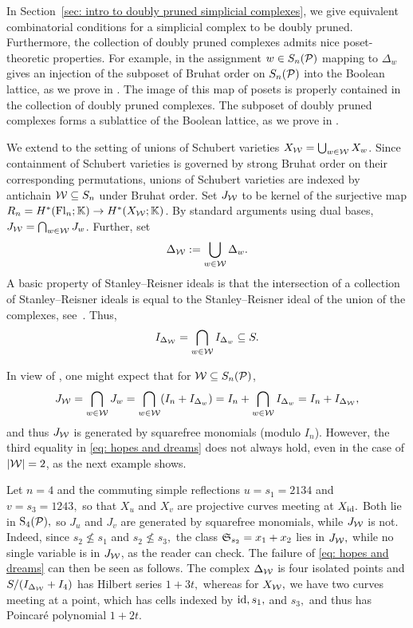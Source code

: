 In Section~\ref{sec: intro to doubly pruned simplicial complexes}, we give equivalent combinatorial conditions for a simplicial complex to be doubly pruned. Furthermore, the collection of doubly pruned complexes admits nice poset-theoretic properties. For example, in the assignment $w\in S_n(\mathcal{P})$ mapping to $\Delta_w$ gives an injection of the subposet of Bruhat order on $S_n(\mathcal{P})$ into the Boolean lattice, as we prove in . The image of this map of posets is properly contained in the collection of doubly pruned complexes. The subposet of doubly pruned complexes forms a sublattice of the Boolean lattice, as we prove in .





We extend  to the setting of unions of Schubert varieties $X_{\mathcal{W}} = \bigcup_{w\in \mathcal{W}}X_w$. Since containment of Schubert varieties is governed by strong Bruhat order on their corresponding permutations, unions of Schubert varieties are indexed by antichain $\mathcal{W}\subseteq S_n$ under Bruhat order. Set $J_{\mathcal{W}}$ to be kernel of the surjective map $R_n = H^*(\mathrm{Fl}_n;\mathbb{K})\to H^*(X_{\mathcal{W}};\mathbb{K})$. By standard arguments using dual bases, $J_{\mathcal{W}} = \bigcap_{w\in \mathcal{W}}J_w$. Further, set
\[
\Delta_{\mathcal{W}} := \bigcup_{w\in\mathcal{W}}\Delta_w.
\]
A basic property of Stanley--Reisner ideals is that the intersection of a collection of Stanley--Reisner ideals is equal to the Stanley--Reisner ideal of the union of the complexes, see~\cite{MillerSturmfels2005}. Thus, 
\[
I_{\Delta_{\mathcal{W}}} = \bigcap_{w\in\mathcal{W}}I_{\Delta_w}\subseteq S.
\]

In view of , one might expect that for $\mathcal{W}\subseteq S_n(\mathcal{P})$,
\begin{equation}\label{eq: hopes and dreams}
J_{\mathcal{W}} =\bigcap_{w\in \mathcal{W}} J_w= \bigcap_{w\in \mathcal{W}} (I_n + I_{\Delta_w}) =  I_n + \bigcap_{w\in \mathcal{W}} I_{\Delta_w}= I_n + I_{\Delta_{\mathcal{W}}},
\end{equation}
and thus $J_{\mathcal{W}}$ is generated by squarefree monomials (modulo $I_n$). However, the third equality in \eqref{eq: hopes and dreams} does not always hold, even in the case of $|\mathcal{W}|=2$, as the next example shows.

\begin{example} 
Let $n = 4$ and the commuting simple reflections $u = s_1 = 2134$ and $v = s_3 = 1243,$ so that $X_u$ and $X_v$ are projective curves meeting at $X_{\mathrm{id}}.$ Both lie in $\mathrm{S}_4(\mathcal{P}),$ so $J_u$ and $J_v$ are generated by squarefree monomials, while $J_{\mathcal{W}}$ is not. Indeed, since $s_2\not\leq s_1$ and $s_2\not\leq s_3,$ the class $\mathfrak{S}_{s_2} = x_1 + x_2$ lies in $J_{\mathcal{W}},$ while no single variable is in $J_{\mathcal{W}}$, as the reader can check. The failure of \eqref{eq: hopes and dreams} can then be seen as follows. The complex $\Delta_{\mathcal{W}}$ is four isolated points and $S/(I_{\Delta_{\mathcal{W}}}+I_4)$ has Hilbert series $1+3t,$ whereas for $X_{\mathcal{W}},$ we have two curves meeting at a point, which has cells indexed by $\mathrm{id}, s_1,$ and $s_3,$ and thus has Poincar\'e polynomial $1+2t.$  
\end{example}

